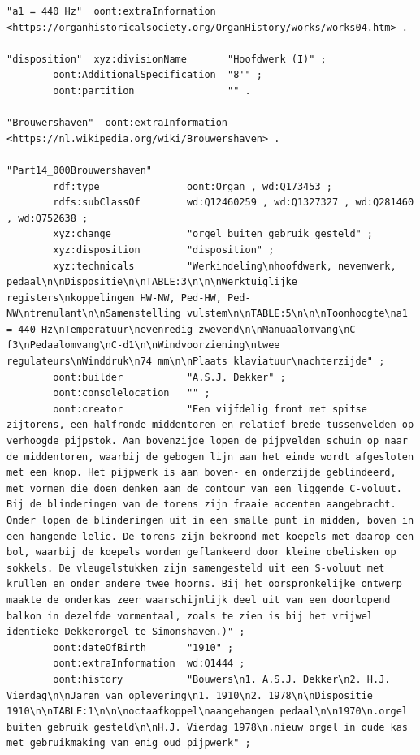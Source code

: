 \begin{lstlisting}[caption={Part14\_000Brouwershaven}]
"a1 = 440 Hz"  oont:extraInformation  <https://organhistoricalsociety.org/OrganHistory/works/works04.htm> .

"disposition"  xyz:divisionName       "Hoofdwerk (I)" ;
        oont:AdditionalSpecification  "8'" ;
        oont:partition                "" .

"Brouwershaven"  oont:extraInformation  <https://nl.wikipedia.org/wiki/Brouwershaven> .

"Part14_000Brouwershaven"
        rdf:type               oont:Organ , wd:Q173453 ;
        rdfs:subClassOf        wd:Q12460259 , wd:Q1327327 , wd:Q281460 , wd:Q752638 ;
        xyz:change             "orgel buiten gebruik gesteld" ;
        xyz:disposition        "disposition" ;
        xyz:technicals         "Werkindeling\nhoofdwerk, nevenwerk, pedaal\n\nDispositie\n\nTABLE:3\n\n\nWerktuiglijke registers\nkoppelingen HW-NW, Ped-HW, Ped-NW\ntremulant\n\nSamenstelling vulstem\n\nTABLE:5\n\n\nToonhoogte\na1 = 440 Hz\nTemperatuur\nevenredig zwevend\n\nManuaalomvang\nC-f3\nPedaalomvang\nC-d1\n\nWindvoorziening\ntwee regulateurs\nWinddruk\n74 mm\n\nPlaats klaviatuur\nachterzijde" ;
        oont:builder           "A.S.J. Dekker" ;
        oont:consolelocation   "" ;
        oont:creator           "Een vijfdelig front met spitse zijtorens, een halfronde middentoren en relatief brede tussenvelden op verhoogde pijpstok. Aan bovenzijde lopen de pijpvelden schuin op naar de middentoren, waarbij de gebogen lijn aan het einde wordt afgesloten met een knop. Het pijpwerk is aan boven- en onderzijde geblindeerd, met vormen die doen denken aan de contour van een liggende C-voluut. Bij de blinderingen van de torens zijn fraaie accenten aangebracht. Onder lopen de blinderingen uit in een smalle punt in midden, boven in een hangende lelie. De torens zijn bekroond met koepels met daarop een bol, waarbij de koepels worden geflankeerd door kleine obelisken op sokkels. De vleugelstukken zijn samengesteld uit een S-voluut met krullen en onder andere twee hoorns. Bij het oorspronkelijke ontwerp maakte de onderkas zeer waarschijnlijk deel uit van een doorlopend balkon in dezelfde vormentaal, zoals te zien is bij het vrijwel identieke Dekkerorgel te Simonshaven.)" ;
        oont:dateOfBirth       "1910" ;
        oont:extraInformation  wd:Q1444 ;
        oont:history           "Bouwers\n1. A.S.J. Dekker\n2. H.J. Vierdag\n\nJaren van oplevering\n1. 1910\n2. 1978\n\nDispositie 1910\n\nTABLE:1\n\n\noctaafkoppel\naangehangen pedaal\n\n1970\n.orgel buiten gebruik gesteld\n\nH.J. Vierdag 1978\n.nieuw orgel in oude kas met gebruikmaking van enig oud pijpwerk" ;

\end{lstlisting}
